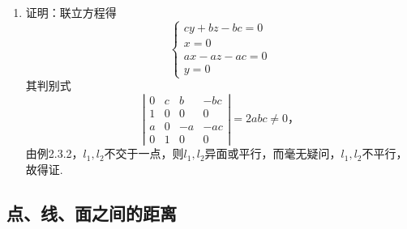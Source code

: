 \documentclass[UTF8]{ctexart}
\begin{document}
\begin{enumerate}
\item 证明：联立方程得$$\left\{\begin{array}{l}cy+bz-bc=0\\x=0\\ax-az-ac=0\\y=0\end{array}\right.$$其判别式$$\left|\begin{array}{cccc}0&c&b&-bc\\1&0&0&0\\a&0&-a&-ac\\0&1&0&0\end{array}\right|=2abc\neq0，$$由例2.3.2，$l_1,l_2$不交于一点，则$l_1,l_2$异面或平行，而毫无疑问，$l_1,l_2$不平行，故得证.
\end{enumerate}

\subsection{点、线、面之间的距离}
\end{document}
